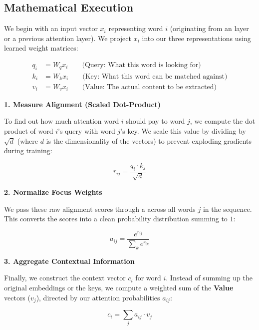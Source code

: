 \subsection*{Mathematical Execution}

We begin with an input vector $x_i$ representing word $i$ (originating from an  layer or a previous attention layer). We project $x_i$ into our three representations using learned weight matrices:

\begin{align*}
    q_i &= W_q x_i \qquad \text{(Query: What this word is looking for)} \\
    k_i &= W_k x_i \qquad \text{(Key: What this word can be matched against)} \\ 
    v_i &= W_v x_i \qquad \text{(Value: The actual content to be extracted)}
\end{align*}



\textbf{1. Measure Alignment (Scaled Dot-Product)}

To find out how much attention word $i$ should pay to word $j$, we compute the dot product of word $i$'s query with word $j$'s key. We scale this value by dividing by $\sqrt{d}$ (where $d$ is the dimensionality of the vectors) to prevent exploding gradients during training:

\[
r_{ij} = \frac{q_i \cdot k_j}{\sqrt{d}}
\]

\textbf{2. Normalize Focus Weights}

We pass these raw alignment scores through a  across all words $j$ in the sequence. This converts the scores into a clean probability distribution summing to $1$:

\[
a_{ij} = \frac{e^{r_{ij}}}{\sum_{k} e^{r_{ik}}}
\]

\textbf{3. Aggregate Contextual Information}

Finally, we construct the context vector $c_i$ for word $i$. Instead of summing up the original embeddings or the keys, we compute a weighted sum of the \textbf{Value} vectors ($v_j$), directed by our attention probabilities $a_{ij}$:

\[
c_i = \sum_{j} a_{ij} \cdot v_j
\]

